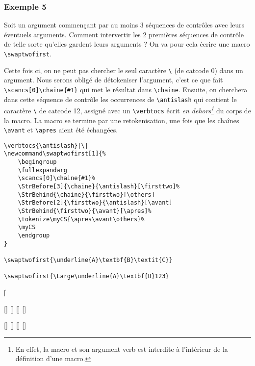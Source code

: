 \documentclass[a4paper,10pt,french]{article}
\newcommand\styleexercice{\footnotesize}
\newcommand\verbinline{\lstinline[basicstyle=\normalsize\ttfamily]}
\begin{document}
\subsubsection{Exemple 5}
Soit un argument commençant par au moins 3 séquences de contrôles avec leurs éventuels arguments. Comment intervertir les 2 premières séquences de contrôle de telle sorte qu'elles gardent leurs arguments ? On va pour cela écrire une macro \verb|\swaptwofirst|.

Cette fois ci, on ne peut pas chercher le seul caractère \og\verb|\|\fg{} (de catcode 0) dans un argument. Nous serons obligé de détokeniser l'argument, c'est ce que fait \verbinline|\scancs[0]\chaine{#1}| qui met le résultat dans \verb|\chaine|. Ensuite, on cherchera dans cette séquence de contrôle les occurrences de \verb|\antislash| qui contient le caractère \og\verb|\|\fg{} de catcode 12, assigné avec un \verbinline|\verbtocs| écrit \emph{en dehors\footnote{En effet, la macro {\tt\string\verbtocs} et son argument verb est interdite à l'intérieur de la définition d'une macro.}} du corps de la macro. La macro se termine par une retokenisation, une fois que les chaînes \verb|\avant| et \verb|\apres| aient été échangées.\medskip

\begin{minipage}[c]{0.65\linewidth}
\begin{lstlisting}
\verbtocs{\antislash}|\|
\newcommand\swaptwofirst[1]{%
	\begingroup
	\fullexpandarg
	\scancs[0]\chaine{#1}%
	\StrBefore[3]{\chaine}{\antislash}[\firsttwo]%
	\StrBehind{\chaine}{\firsttwo}[\others]
	\StrBefore[2]{\firsttwo}{\antislash}[\avant]
	\StrBehind{\firsttwo}{\avant}[\apres]%
	\tokenize\myCS{\apres\avant\others}%
	\myCS
	\endgroup
}

\swaptwofirst{\underline{A}\textbf{B}\textit{C}}

\swaptwofirst{\Large\underline{A}\textbf{B}123}
\end{lstlisting}%
\end{minipage}\hfill
\begin{minipage}[c]{0.35\linewidth}
	\styleexercice
	\verbtocs{\antislash}|\|
	\newcommand\swaptwofirst[1]{%
		\begingroup
		\fullexpandarg
		\scancs[0]\chaine{#1}%
		\StrBefore[3]{\chaine}{\antislash}[\firsttwo]%
		\StrBehind{\chaine}{\firsttwo}[\others]
		\StrBefore[2]{\firsttwo}{\antislash}[\avant]
		\StrBehind{\firsttwo}{\avant}[\apres]%
		\tokenize\myCS{\apres\avant\others}%
		\myCS
		\endgroup
	}

	\swaptwofirst{\underline{A}\textbf{B}\textit{C}}

	\swaptwofirst{\Large\underline{A}\textbf{B}123}
\end{minipage}%
\end{document}
